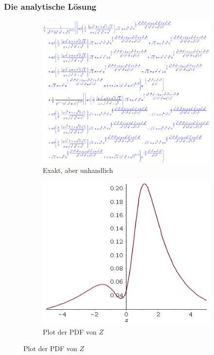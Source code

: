\documentclass[11pt]{beamer}
\begin{document}
\begin{frame}
  \frametitle{Die analytische Lösung}
  \begin{figure}
    \centering
    \begin{subfigure}{0.45\textwidth}
      \includegraphics[width=\textwidth]{thesis/introduction/maple-pdf}
      \caption{Exakt, aber unhandlich}
    \end{subfigure}
    \hfill
    \begin{subfigure}{0.45\textwidth}
      \includegraphics[width=\textwidth]{thesis/introduction/maple-plot}
      \caption{Plot der PDF von $Z$}
    \end{subfigure}
  \end{figure}
\end{frame}
\end{document}
